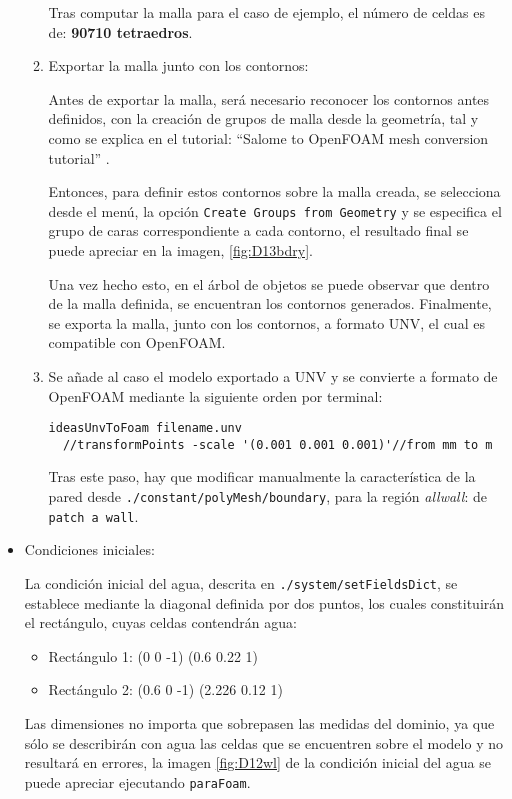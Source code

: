 \begin{itemize}
\begin{enumerate}
    Tras computar la malla para el caso de ejemplo, el número de celdas
    es de: \textbf{90710 tetraedros}.
  \item
    Exportar la malla junto con los contornos:

    Antes de exportar la malla, será necesario reconocer los contornos
    antes definidos, con la creación de grupos de malla desde la
    geometría, tal y como se explica en el tutorial: ``Salome
    to OpenFOAM mesh conversion tutorial'' \cite{Salome_to_OpenFOAM}.

    Entonces, para definir estos contornos sobre la malla creada, se
    selecciona desde el menú, la opción
    \texttt{Create\ Groups\ from\ Geometry} y se especifica el grupo de
    caras correspondiente a cada contorno, el resultado final se puede
    apreciar en la imagen, \autoref{fig:D13bdry}.

    Una vez hecho esto, en el árbol de objetos se puede observar que
    dentro de la malla definida, se encuentran los contornos generados.
    Finalmente, se exporta la malla, junto con los contornos, a formato
    UNV, el cual es compatible con OpenFOAM.
  \item
    Se añade al caso el modelo exportado a UNV y se convierte a formato
    de OpenFOAM mediante la siguiente orden por terminal:

\begin{lstlisting}[style=c++]
  ideasUnvToFoam filename.unv
  //transformPoints -scale '(0.001 0.001 0.001)'//from mm to m
\end{lstlisting}

    Tras este paso, hay que modificar manualmente la característica de
    la pared desde
    \lstinline[style=bash]{./constant/polyMesh/boundary}, para la
    región \emph{allwall}: de \texttt{patch\ a\ wall}.
  \end{enumerate}
\item
  Condiciones iniciales:

  La condición inicial del agua, descrita en
  \lstinline[style=bash]{./system/setFieldsDict}, se establece mediante
  la diagonal definida por dos puntos, los cuales constituirán el
  rectángulo, cuyas celdas contendrán agua:

  \begin{itemize}
  \item
    Rectángulo 1: (0 0 -1) (0.6 0.22 1)
  \item
    Rectángulo 2: (0.6 0 -1) (2.226 0.12 1)
  \end{itemize}

  Las dimensiones no importa que sobrepasen las medidas del dominio, ya
  que sólo se describirán con agua las celdas que se encuentren sobre el
  modelo y no resultará en errores, la imagen \autoref{fig:D12wl} de la condición inicial del agua se puede apreciar ejecutando \texttt{paraFoam}.
\end{itemize}


